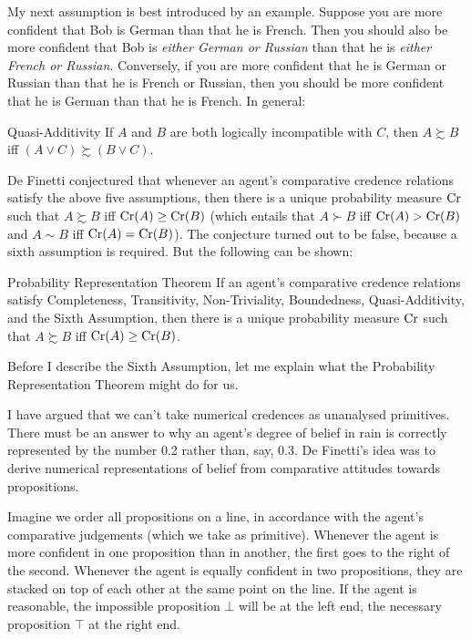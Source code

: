 My next assumption is best introduced by an example. Suppose you are
more confident that Bob is German than that he is French.  Then you
should also be more confident that Bob is \emph{either German or
  Russian} than that he is \emph{either French or
  Russian}. Conversely, if you are more confident that he is German or
Russian than that he is French or Russian, then you should be more
confident that he is German than that he is French. In general:

\begin{genericthm}{Quasi-Additivity}
  If $A$ and $B$ are both logically incompatible with $C$, then $A
  \succsim B$ iff $(A \lor C) \succsim (B \lor C)$.
\end{genericthm}

De Finetti conjectured that whenever an agent's comparative credence relations
satisfy the above five assumptions, then there is a unique probability measure
$\text{Cr}$ such that $A \succsim B$ iff $\text{Cr}(A) \geq \text{Cr}(B)$ (which entails that
$A \succ B$ iff $\text{Cr}(A) > \text{Cr}(B)$ and $A \sim B$ iff $\text{Cr}(A) = \text{Cr}(B)$). The
conjecture turned out to be false, because a sixth assumption is required. But
the following can be shown:
%
\begin{genericthm}{Probability Representation Theorem}
  If an agent's comparative credence relations satisfy Completeness,
  Transitivity, Non-Triviality, Boundedness, Quasi-Additivity, and the
  Sixth Assumption, then there is a unique probability measure $\text{Cr}$
  such that $A \succsim B$ iff $\text{Cr}(A) \geq \text{Cr}(B)$.
\end{genericthm}
%
Before I describe the Sixth Assumption, let me explain what the
Probability Representation Theorem might do for us.

I have argued that we can't take numerical credences as unanalysed primitives.
There must be an answer to why an agent's degree of belief in rain is correctly
represented by the number 0.2 rather than, say, 0.3. De Finetti's idea was to
derive numerical representations of belief from comparative attitudes towards
propositions.

Imagine we order all propositions on a line, in accordance with the agent's
comparative judgements (which we take as primitive). Whenever the agent is more
confident in one proposition than in another, the first goes to the right of the
second. Whenever the agent is equally confident in two propositions, they are
stacked on top of each other at the same point on the line. If the agent is
reasonable, the impossible proposition $\bot$ will be at the left end, the
necessary proposition $\top$ at the right end.

